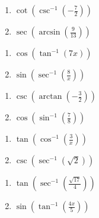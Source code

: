 \smallskip
\begin{multicols}{2}
\begin{enumerate}	\setcounter{enumi}{\value{Review}}
	\item $\cot\left(\csc^{-1}\left(-\frac{7}{2}\right)\right)$
	\item $\sec\left(\arcsin\left(\frac{9}{13}\right)\right)$
\end{enumerate}	\setcounter{Review}{\value{enumi}}
\end{multicols}
\smallskip
\begin{multicols}{2}
\begin{enumerate}	\setcounter{enumi}{\value{Review}}
	\item $\cos\left(\tan^{-1}(7x)\right)$
	\item $\sin\left(\sec^{-1}\left(\frac{8}{x}\right)\right)$
\end{enumerate}	\setcounter{Review}{\value{enumi}}
\end{multicols}
\smallskip
\begin{multicols}{2}
\begin{enumerate}	\setcounter{enumi}{\value{Review}}
	\item $\csc\left(\arctan\left(-\frac{3}{2}\right)\right)$
	\item $\cos\left(\sin^{-1}\left(\frac{7}{8}\right)\right)$
\end{enumerate}	\setcounter{Review}{\value{enumi}}
\end{multicols}
\smallskip
\begin{multicols}{2}
\begin{enumerate}	\setcounter{enumi}{\value{Review}}
	\item $\tan\left(\cos^{-1}\left(\frac{3}{x}\right)\right)$
	\item $\csc\left(\sec^{-1}\left(\sqrt{2}\right)\right)$
\end{enumerate}	\setcounter{Review}{\value{enumi}}
\end{multicols}
\smallskip
\begin{multicols}{2}
\begin{enumerate}	\setcounter{enumi}{\value{Review}}
	\item $\tan\left(\sec^{-1}\left(\frac{\sqrt{17}}{4}\right)\right)$
	\item $\sin\left(\tan^{-1}\left(\frac{4x}{5}\right)\right)$
\end{enumerate}
\end{multicols}

\newpage

